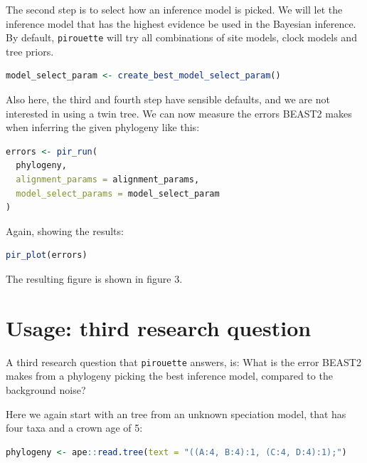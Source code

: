 \documentclass{article}
\begin{document}
The second step is to select how an inference model is picked.
We will let the inference model that has the highest evidence be used
in the Bayesian inference. By default, \verb;pirouette; will try
all combinations of site models, clock models and tree priors.

\begin{lstlisting}[language=R, floatplacement=H]
model_select_param <- create_best_model_select_param()
\end{lstlisting}

Also here, the third and fourth step have sensible defaults, and we are not
interested in using a twin tree. We can now measure the errors BEAST2
makes when inferring the given phylogeny like this:

\begin{lstlisting}[language=R, floatplacement=H]
errors <- pir_run(
  phylogeny,
  alignment_params = alignment_params,
  model_select_params = model_select_param
)
\end{lstlisting}

Again, showing the results:

\begin{lstlisting}[language=R, floatplacement=H]
pir_plot(errors)
\end{lstlisting}

The resulting figure is shown in figure 3.

\section{Usage: third research question}

A third research question that \verb;pirouette; answers, is:
What is the error BEAST2 makes from a phylogeny 
picking the best inference model, compared to the background noise?

Here we again start with an tree from an unknown speciation model,
that has four taxa and a crown age of 5:

\begin{lstlisting}[language=R, floatplacement=H]
phylogeny <- ape::read.tree(text = "((A:4, B:4):1, (C:4, D:4):1);")
\end{lstlisting}
\end{document}
